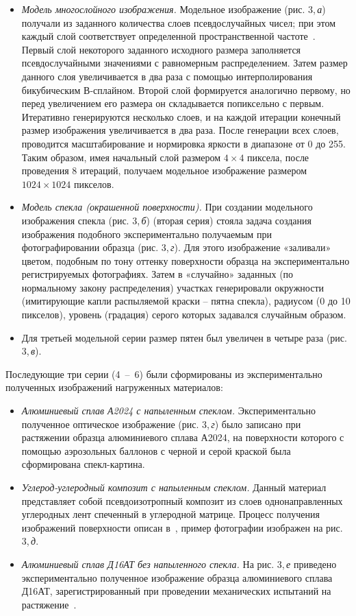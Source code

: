 \documentclass[a4paper]{jctart10}
\begin{document}
\begin{itemize}
	\item {\it Модель многослойного изображения.} Модельное изображение (рис. 3,\,{\it а}) получали из заданного количества слоев псевдослучайных чисел; при этом каждый слой соответствует определенной пространственной частоте~\cite{15}. Первый слой некоторого заданного исходного размера заполняется псевдослучайными значениями с равномерным распределением. Затем размер данного слоя увеличивается в два раза с помощью интерполирования бикубическим В-сплайном. Второй слой формируется аналогично первому, но перед увеличением его размера он складывается попиксельно с первым. Итеративно генерируются несколько слоев, и на каждой итерации конечный размер изображения увеличивается в два раза. После генерации всех слоев, проводится масштабирование и нормировка яркости в диапазоне от 0 до 255. Таким образом, имея начальный слой размером $4 \times 4$ пиксела, после проведения 8 итераций, получаем модельное изображение размером $1024 \times 1024$ пикселов.
	\item {\it Модель спекла (окрашенной поверхности).} При создании модельного изображения спекла (рис. 3,\,{\it б}) (вторая серия) стояла задача создания изображения подобного экспериментально получаемым при фотографировании образца (рис. 3,\,{\it г}). Для этого изображение «заливали» цветом, подобным по тону оттенку поверхности образца на экспериментально регистрируемых фотографиях. Затем в «случайно» заданных (по нормальному закону распределения) участках генерировали окружности (имитирующие капли распыляемой краски – пятна спекла), радиусом (0 до 10 пикселов), уровень (градация) серого которых задавался случайным образом.
	\item Для третьей модельной серии размер пятен был увеличен в четыре раза (рис. 3,\,{\it в}).	
\end{itemize}
Последующие три серии (4~--~6) были сформированы из экспериментально полученных изображений нагруженных материалов:
\begin{itemize}
	\item {\it Алюминиевый сплав А2024 с напыленным спеклом.} Экспериментально полученное оптическое изображение (рис. 3,\,{\it г}) было записано при растяжении образца алюминиевого сплава А2024, на поверхности которого с помощью аэрозольных баллонов с черной и серой краской была сформирована спекл-картина.
	\item {\it Углерод-углеродный композит с напыленным спеклом.} Данный материал представляет собой псевдоизотропный композит из слоев однонаправленных углеродных лент спеченный в углеродной матрице. Процесс получения изображений поверхности описан в~\cite{16}, пример фотографии изображен на рис. 3,\,{\it д}.
	\item {\it Алюминиевый сплав Д16АТ без напыленного спекла.} На рис. 3,\,{\it е} приведено экспериментально полученное изображение образца алюминиевого сплава Д16АТ, зарегистрированный при проведении механических испытаний на растяжение~\cite{17}.
\end{itemize}
\end{document}
